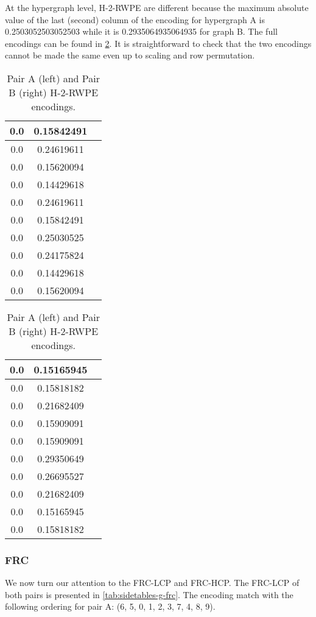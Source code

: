 At the hypergraph level, H-2-RWPE are different because the maximum absolute value of the last (second) column of the encoding for hypergraph A is 0.2503052503052503 while it is 0.2935064935064935 for graph B. The full encodings can be found in \ref{tab:sidetables-hg}. It is straightforward to check that the two encodings cannot be made the same even up to scaling and row permutation.
\begin{table}[h]
\centering
\footnotesize
\begin{tabular}{|c|c|c|}
    \hline
    0.0 & 0.15842491 \\ \hline
    0.0 & 0.24619611 \\ \hline
    0.0 & 0.15620094 \\ \hline
    0.0 & 0.14429618 \\ \hline
    0.0 & 0.24619611 \\ \hline
    0.0 & 0.15842491 \\ \hline
    0.0 & 0.25030525 \\ \hline
    0.0 & 0.24175824 \\ \hline
    0.0 & 0.14429618 \\ \hline
    0.0 & 0.15620094 \\ \hline
\end{tabular}    
\begin{tabular}{|c|c|c|}
  \hline
  0.0 & 0.15165945 \\ \hline
  0.0 & 0.15818182 \\ \hline
  0.0 & 0.21682409 \\ \hline
  0.0 & 0.15909091 \\ \hline
  0.0 & 0.15909091 \\ \hline
  0.0 & 0.29350649 \\ \hline
  0.0 & 0.26695527 \\ \hline
  0.0 & 0.21682409 \\ \hline
  0.0 & 0.15165945 \\ \hline
  0.0 & 0.15818182 \\ \hline
\end{tabular}
  \caption{Pair A (left) and Pair B (right) H-2-RWPE encodings.}
  \label{tab:sidetables-hg}
\end{table}

\subsubsection{FRC}

We now turn our attention to the FRC-LCP and FRC-HCP. The FRC-LCP of both pairs is presented in \ref{tab:sidetables-g-frc}. The encoding match with the following ordering for pair A: (6, 5, 0, 1, 2, 3, 7, 4, 8, 9).

